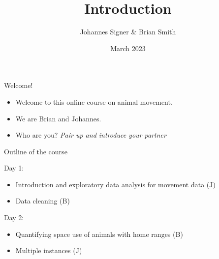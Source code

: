 \documentclass[ignorenonframetext,,t]{beamer}
\title{Introduction}
\author{Johannes Signer \& Brian Smith}
\date{March 2023}
\providecommand{\tightlist}{%
\setlength{\itemsep}{0pt}\setlength{\parskip}{0pt}}
\providecommand{\tightlist}{%
\setlength{\itemsep}{0pt}\setlength{\parskip}{0pt}}
\renewcommand{\tightlist}{\setlength{\itemsep}{1.4ex}\setlength{\parskip}{0pt}}
\begin{document}
\frame{\titlepage}



\begin{frame}{Welcome!}
\protect\hypertarget{welcome}{}
\begin{itemize}
\tightlist
\item
  Welcome to this online course on animal movement.
\item
  We are Brian and Johannes.
\item
  Who are you? \emph{Pair up and introduce your partner}
\end{itemize}
\end{frame}

\begin{frame}{Outline of the course}
\protect\hypertarget{outline-of-the-course}{}
\begin{block}{Day 1:}
\protect\hypertarget{day-1}{}
\begin{itemize}
\tightlist
\item
  Introduction and exploratory data analysis for movement data (J)
\item
  Data cleaning (B)
\end{itemize}
\end{block}

\begin{block}{Day 2:}
\protect\hypertarget{day-2}{}
\begin{itemize}
\tightlist
\item
  Quantifying space use of animals with home ranges (B)
\item
  Multiple instances (J)
\end{itemize}
\end{block}
\end{frame}
\end{document}
